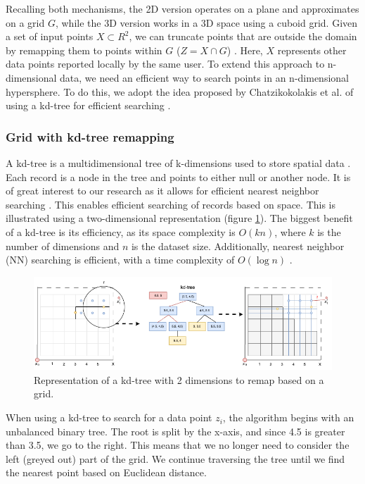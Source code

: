 Recalling both mechanisms, the 2D version operates on a plane and approximates on a grid $G$, while the 3D version works in a 3D space using a cuboid grid.
Given a set of input points $X \subset R^2$, we can truncate points that are outside the domain by remapping them to points within $G$ ($Z = X \cap G$) \citep{DBLP:journals/corr/abs-1212-1984}.
Here, $X$ represents other data points reported locally by the same user.
To extend this approach to n-dimensional data, we need an efficient way to search points in an n-dimensional hypersphere.
To do this, we adopt the idea proposed by Chatzikokolakis et al. of using a kd-tree for efficient searching \citep{chatzikokolakis_efficient_2017}.
\subsubsection{Grid with kd-tree remapping}
A kd-tree is a multidimensional tree of k-dimensions used to store spatial data \citep{bentley_multidimensional_1975}.
Each record is a node in the tree and points to either null or another node.
It is of great interest to our research as it allows for efficient nearest neighbor searching \citep{washington_k-d_2002}.
This enables efficient searching of records based on space. This is illustrated using a two-dimensional representation (figure \ref{fig:kd-tree}).
The biggest benefit of a kd-tree is its efficiency, as its space complexity is $O(kn)$, where $k$ is the number of dimensions and $n$ is the dataset size.
Additionally, nearest neighbor (NN) searching is efficient, with a time complexity of $O(\log n)$ \citep{washington_k-d_2002}.
\begin{figure}[H]
  \includegraphics[width=1\textwidth]{TheorethicalFramework/ND-Laplace/Images/KD-tree.png}
  \caption{Representation of a kd-tree with 2 dimensions to remap based on a grid.}
  \label{fig:kd-tree}
\end{figure}
When using a kd-tree to search for a data point $z_i$, the algorithm begins with an unbalanced binary tree.
The root is split by the x-axis, and since 4.5 is greater than 3.5, we go to the right.
This means that we no longer need to consider the left (greyed out) part of the grid.
We continue traversing the tree until we find the nearest point based on Euclidean distance.

